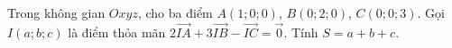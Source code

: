 \begin{ex}
Trong không gian $Oxyz$, cho ba điểm $A(1;0;0)$, $B(0;2;0)$, $C(0;0;3)$. Gọi $I(a;b;c)$ là điểm thỏa mãn $2\overrightarrow{IA}+3\overrightarrow{IB}-\overrightarrow{IC}=\overrightarrow{0}$. Tính $S=a+b+c$.
\end{ex}
